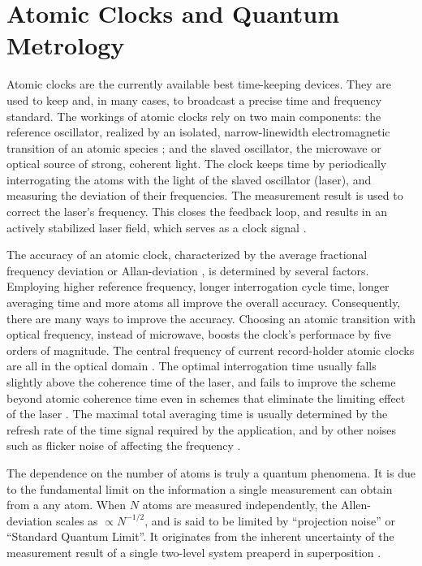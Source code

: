 \section{Atomic Clocks and Quantum Metrology}
Atomic clocks are the currently available best time-keeping devices. They are
used to keep and, in many cases, to broadcast a precise time and frequency
standard. The workings of atomic clocks rely on two main components: the
reference oscillator, realized by an isolated, narrow-linewidth electromagnetic
transition of an atomic species \cite{Derevianko2011}; and the slaved
oscillator, the microwave or optical source of strong, coherent light. The clock
keeps time by periodically interrogating the atoms with the light of the slaved
oscillator (laser), and measuring the deviation of their frequencies. The
measurement result is used to correct the laser's frequency. This closes the
feedback loop, and results in an actively stabilized laser field, which serves
as a clock signal \cite{Diddams2004}.

The accuracy of an atomic clock, characterized by the average fractional
frequency deviation or Allan-deviation 
\cite{Allan1966, Rutman1978}, is determined by several factors. Employing
higher reference frequency, longer interrogation cycle time, longer averaging
time and more atoms all improve the overall accuracy. Consequently, there are
many ways to improve the accuracy. Choosing an atomic transition with optical
frequency, instead of microwave, boosts the clock's performace by five orders of
magnitude. The central frequency of current record-holder atomic clocks are all
in the optical domain \cite{Ludlow2015}. The optimal interrogation time usually
falls slightly above the coherence time of the laser, and fails to improve the scheme
beyond atomic coherence time even in schemes that eliminate the limiting effect
of the laser \cite{Borregaard2013, Rosenband2013}. The maximal
total averaging time is usually determined by the refresh rate of the time
signal required by the application, and by other noises such as flicker noise of
affecting the frequency \cite{Barnes1966}.

The dependence on the number of atoms is truly a quantum phenomena. It is due to
the fundamental limit on the information a single measurement can obtain from a
any atom. When $N$ atoms are measured independently, the Allen-deviation scales
as $\propto N^{-1/2}$, and is said to be limited by ``projection noise'' or
``Standard Quantum Limit''. It originates from the inherent uncertainty of
the measurement result of a single two-level system preaperd in superposition
\cite{Santarelli1998}.

